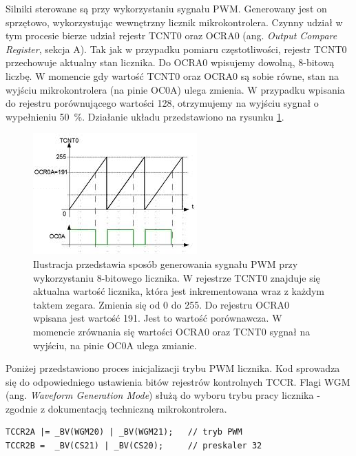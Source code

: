Silniki sterowane są przy wykorzystaniu sygnału PWM. Generowany jest on sprzętowo, wykorzystując wewnętrzny licznik mikrokontrolera. Czynny udział w tym procesie bierze udział rejestr TCNT0 oraz OCRA0 (ang. \textit{Output Compare Register}, sekcja A). Tak jak w przypadku pomiaru częstotliwości, rejestr TCNT0 przechowuje aktualny stan licznika. Do OCRA0 wpisujemy dowolną, 8-bitową liczbę. W momencie gdy wartość TCNT0 oraz OCRA0 są sobie równe, stan na wyjściu mikrokontrolera (na pinie OC0A) ulega zmienia. W przypadku wpisania do rejestru porównującego wartości 128, otrzymujemy na wyjściu sygnał o wypełnieniu 50~\%. Działanie układu przedstawiono na rysunku \ref{gen_pwn}.
\newpage
\begin{figure}[H]
    \begin{center}
      \includegraphics[scale=0.9]{imgs/pwm_gen.png}
 	\caption[Realizacja sygnału PWM.]{\small{Ilustracja przedstawia sposób generowania sygnału PWM przy wykorzystaniu 8-bitowego licznika. W rejestrze TCNT0 znajduje się aktualna wartość licznika, która jest inkrementowana wraz z każdym taktem zegara. Zmienia się od 0 do 255. Do rejestru OCRA0 wpisana jest wartość 191. Jest to wartość porównawcza. W momencie zrównania się wartości OCRA0 oraz TCNT0 sygnał na wyjściu, na pinie OC0A ulega zmianie.}\footnotemark}
	\label{gen_pwn}
    \end{center}
  \end{figure}  
\noindent
Poniżej przedstawiono proces inicjalizacji trybu PWM licznika. Kod sprowadza się do odpowiedniego ustawienia bitów rejestrów kontrolnych TCCR. Flagi WGM (ang. \textit{Waveform Generation Mode}) służą do wyboru trybu pracy licznika - zgodnie z dokumentacją techniczną mikrokontrolera\cite{nota}. 
  \begin{lstlisting}
TCCR2A |= _BV(WGM20) | _BV(WGM21);   // tryb PWM
TCCR2B =  _BV(CS21) | _BV(CS20);     // preskaler 32
\end{lstlisting}
